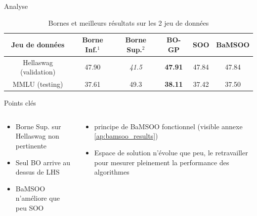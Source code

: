 \begin{frame}{Analyse}
    \begin{table}[h!]
        \centering
        \begin{tabular}{|c||c|c||c|c|c|}
        \hline
           Jeu de données  & Borne Inf.$^1$& Borne Sup.$^2$ & BO-GP & SOO & BaMSOO \\
        \hline
           Hellaswag (validation)  & 47.90 & \textit{41.5} & \textbf{47.91} & 47.84 & 47.84\\
           MMLU (testing) & 37.61 & 49.3 & \textbf{38.11} & 37.42 & 37.50 \\
        \hline
        \end{tabular}
        \caption{Bornes et meilleurs résultats sur les 2 jeu de données}
    \end{table}
    \vspace*{-5pt}{\footnotesize 1 : expérience avec LHS; 2 : Fine tuning par Meta}

    \begin{block}{Points clés}     
    \end{block}
    
    \vspace*{-15pt}
    \begin{columns}
        
        \begin{column}{0.45\textwidth} 
                \begin{itemize}
                    \item Borne Sup. sur Hellaswag non pertinente
                    \item Seul BO arrive au dessus de LHS
                    \item BaMSOO n'améliore que peu SOO
                \end{itemize}
        \end{column}  
            \begin{column}{0.45\textwidth}
                \begin{itemize}
                    \item principe de BaMSOO fonctionnel (visible annexe \ref{ap:bamsoo_results})
                    \item Espace de solution n'évolue que peu, le retravailler pour mesurer pleinement la performance des algorithmes
                \end{itemize}
            \end{column}          
    \end{columns}
    
\end{frame}

